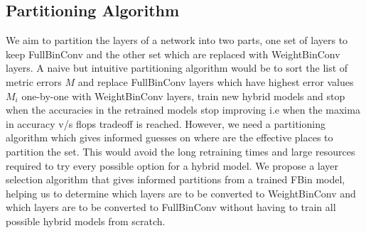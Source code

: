 \documentclass[10pt,twocolumn,letterpaper]{article}
\begin{document}
\subsection{Partitioning Algorithm}

We aim to partition the layers of a network into two parts, one set of layers to keep FullBinConv and the other set which are replaced with WeightBinConv layers. A naive but intuitive partitioning algorithm would be to sort the list of metric errors {\bf $M$} and replace FullBinConv layers which have highest error values {\bf $M_i$} one-by-one with WeightBinConv layers, train new hybrid models and stop when the accuracies in the retrained models stop improving i.e when the maxima in accuracy v/s flops tradeoff is reached. However, we need a partitioning algorithm which gives informed guesses on where are the effective places to partition the set. This would avoid the long retraining times and large resources required to try every possible option for a hybrid model. We propose a layer selection algorithm that gives informed partitions from a trained FBin model, helping us to determine which layers are to be converted to WeightBinConv and which layers are to be converted to FullBinConv without having to train all possible hybrid models from scratch.
\end{document}
